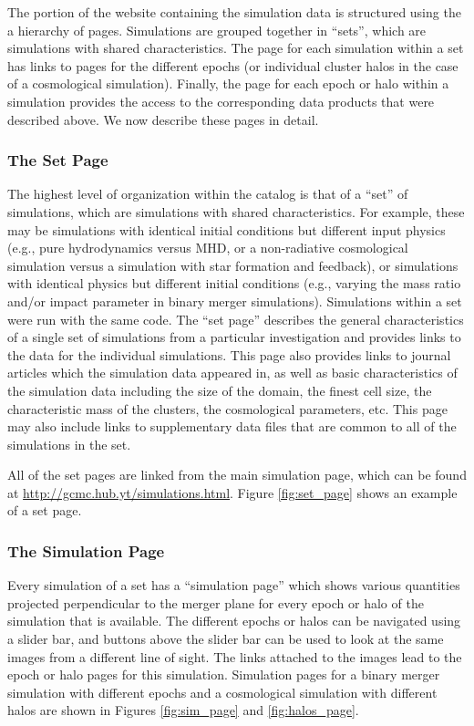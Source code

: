 \documentclass{emulateapj}
\begin{document}
The portion of the website containing the simulation data is structured using the a hierarchy of pages. Simulations are grouped together in ``sets'', which are simulations with shared characteristics. The page for each simulation within a set has links to pages for the different epochs (or individual cluster halos in the case of a cosmological simulation). Finally, the page for each epoch or halo within a simulation provides the access to the corresponding data products that were described above. We now describe these pages in detail.

\subsubsection{The Set Page}\label{sec:set_page}

The highest level of organization within the catalog is that of a ``set'' of simulations, which are simulations with shared characteristics. For example, these may be simulations with identical initial conditions but different input physics (e.g., pure hydrodynamics versus MHD, or a non-radiative cosmological simulation versus a simulation with star formation and feedback), or simulations with identical physics but different initial conditions (e.g., varying the mass ratio and/or impact parameter in binary merger simulations). Simulations within a set were run with the same code. The ``set page'' describes the general characteristics of a single set of simulations from a particular investigation and provides links to the data for the individual simulations. This page also provides links to journal articles which the simulation data appeared in, as well as basic characteristics of the simulation data including the size of the domain, the finest cell size, the characteristic mass of the clusters, the cosmological parameters, etc. This page may also include links to supplementary data files that are common to all of the simulations in the set.

All of the set pages are linked from the main simulation page, which can be found at \url{http://gcmc.hub.yt/simulations.html}. Figure \ref{fig:set_page} shows an example of a set page.

\subsubsection{The Simulation Page}\label{sec:sim_page}

Every simulation of a set has a ``simulation page'' which shows various quantities projected perpendicular to the merger plane for every epoch or halo of the simulation that is available. The different epochs or halos can be navigated using a slider bar, and buttons above the slider bar can be used to look at the same images from a different line of sight. The links attached to the images lead to the epoch or halo pages for this simulation. Simulation pages for a binary merger simulation with different epochs and a cosmological simulation with different halos are shown in Figures \ref{fig:sim_page} and \ref{fig:halos_page}.
\end{document}
